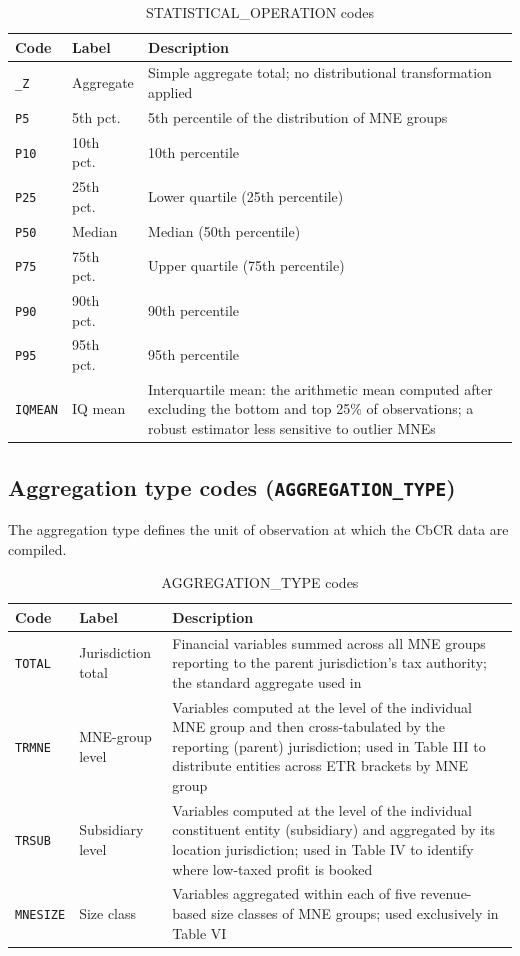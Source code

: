 \documentclass[11pt,a4paper]{article}
\newcommand{\code}[1]{\texttt{#1}}
\begin{document}
\begin{table}[H]
\centering
\caption{STATISTICAL\_OPERATION codes}
\label{tab:statops}
\begin{tabular}{@{}llp{9.5cm}@{}}
\toprule
Code & Label & Description \\
\midrule
\code{\_Z} & Aggregate & Simple aggregate total; no distributional transformation applied \\
\code{P5} & 5th pct.\ & 5th percentile of the distribution of MNE groups \\
\code{P10} & 10th pct.\ & 10th percentile \\
\code{P25} & 25th pct.\ & Lower quartile (25th percentile) \\
\code{P50} & Median & Median (50th percentile) \\
\code{P75} & 75th pct.\ & Upper quartile (75th percentile) \\
\code{P90} & 90th pct.\ & 90th percentile \\
\code{P95} & 95th pct.\ & 95th percentile \\
\code{IQMEAN} & IQ mean & Interquartile mean: the arithmetic mean computed after excluding the bottom and top 25\% of observations; a robust estimator less sensitive to outlier MNEs \\
\bottomrule
\end{tabular}
\end{table}

\subsection{Aggregation type codes (\texttt{AGGREGATION\_TYPE})}

The aggregation type defines the unit of observation at which the CbCR data are
compiled. 

\begin{table}[H]
\centering
\caption{AGGREGATION\_TYPE codes}
\label{tab:aggtypes}
\begin{tabular}{@{}llp{8cm}@{}}
\toprule
Code & Label & Description \\
\midrule
\code{TOTAL} & Jurisdiction total & Financial variables summed across all MNE groups reporting to the parent jurisdiction's tax authority; the standard aggregate used in \citet{barake2022} \\
\code{TRMNE} & MNE-group level & Variables computed at the level of the individual MNE group and then cross-tabulated by the reporting (parent) jurisdiction; used in Table III to distribute entities across ETR brackets by MNE group \\
\code{TRSUB} & Subsidiary level & Variables computed at the level of the individual constituent entity (subsidiary) and aggregated by its location jurisdiction; used in Table IV to identify where low-taxed profit is booked \\
\code{MNESIZE} & Size class & Variables aggregated within each of five revenue-based size classes of MNE groups; used exclusively in Table VI \\
\bottomrule
\end{tabular}
\end{table}
\end{document}
